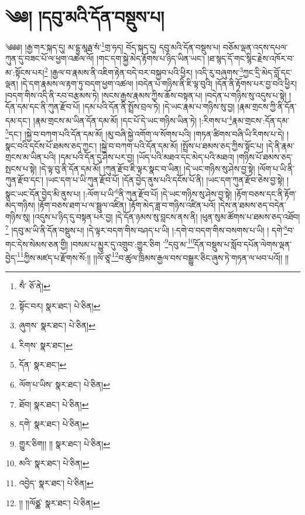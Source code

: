 \setcounter{footnote}{0} 
\chapter{༄༅། །དབུ་མའི་དོན་བསྡུས་པ།}༄༅༅། །རྒྱ་གར་སྐད་དུ། མ་དྷྱ་མཱརྠ་སཾ་\footnote{སྃ་  ཅོ་ནེ། }གྲ་ཧད། བོད་སྐད་དུ། དབུ་མའི་དོན་བསྡུས་པ། བཅོམ་ལྡན་འདས་དཔལ་ཀུན་དུ་བཟང་པོ་ལ་ཕྱག་འཚལ་ལོ། །གང་དག་སྐྱེ་མེད་རྟོགས་པ་ཉིད་ཡིན་ཡང་། །ཐ་སྙད་དོ་གང་སྙིང་རྗེས་འཁོར་བ་མ་:སྟོངས་པར།\footnote{སྟོང་བར།  སྣར་ཐང་།  པེ་ཅིན། } །རྒྱལ་བ་རྣམས་ནི་འཇིག་རྟེན་བདེ་བར་བསྐྱབ་པའི་ཕྱིར། །འདི་རུ་བཞུགས་\footnote{ཞུགས་  སྣར་ཐང་།  པེ་ཅིན། }ཀྱང་དྲི་མེད་བློ་དང་ལྡན། །དེ་དག་རྣམས་ལ་རྟག་ཏུ་བདག་ཕྱག་འཚལ། །བདེན་པ་གཉིས་ནི་ཇི་ལྟ་བུའི། །དོན་ནི་རྟོགས་པར་བྱ་བའི་ཕྱིར། །བདག་གིས་འདི་ནི་རབ་བརྩམས་ཏེ། །སངས་རྒྱས་རྣམས་ཀྱིས་ཆོས་བསྟན་པ། །བདེན་པ་གཉིས་སུ་འདུས་པ་སྟེ། །དོན་དམ་དང་ནི་ཀུན་རྫོབ་པོ། །དམ་པའི་དོན་ནི་སྤྲོས་བྲལ་ཏེ། །དེ་ཡང་རྣམ་པ་གཉིས་སུ་བྱ། །རྣམ་གྲངས་ཀྱི་ནི་དོན་དམ་དང་། །རྣམ་གྲངས་མ་ཡིན་དོན་དམ་མོ། །དང་པོ་དེ་ཡང་གཉིས་ཡིན་ཏེ། །:རིགས་པ་\footnote{རིགས་  སྣར་ཐང་། }རྣམ་གྲངས་:དོན་དམ་\footnote{དོན་  སྣར་ཐང་། }དང་། །སྐྱེ་བ་བཀག་པའི་དོན་དམ་མོ། །མུ་བཞི་སྐྱེ་འགོག་ལ་སོགས་པའི། །གཏན་ཚིགས་བཞི་ཡི་རིགས་པ་དེ། །སྣང་བའི་དངོས་པོ་ཐམས་ཅད་ཀྱང་། །སྐྱེ་བ་བཀག་པའི་དོན་དམ་མོ། །སྤྲོས་པ་ཐམས་ཅད་ཀྱིས་སྟོང་པ། །དེ་ནི་རྣམ་གྲངས་མ་ཡིན་པའི། །དམ་པའི་དོན་དུ་ཤེས་པར་བྱ། །ཡོད་པའི་མཐའ་དང་མེད་པའི་མཐའ། །གཉིས་པོ་ཐམས་ཅད་སྤངས་པ་སྟེ། །དེ་ལྟ་བུ་ནི་དོན་དམ་མོ། །ཀུན་རྫོབ་ཇི་ལྟར་སྣང་བ་ཡིན། །དེ་ཡང་གཉིས་སུ་ཤེས་བྱ་སྟེ། །ལོག་པ་ཡི་ནི་ཀུན་རྫོབ་དང་། །ཡང་དག་པ་ཡི་ཀུན་རྫོབ་པོ། །དོན་བྱེད་ནུས་པའི་དངོས་པོ་ནི། །ཡང་དག་ཀུན་རྫོབ་ཅེས་བྱ་སྟེ། །སྣང་ཡང་དོན་བྱེད་མི་ནུས་པ། །:ལོག་པ་ཡི་\footnote{ལོག་པ་ཡིས་  སྣར་ཐང་།  པེ་ཅིན། }ནི་ཀུན་རྫོབ་པོ། །དེ་ཡང་གཉིས་སུ་ཤེས་བྱ་སྟེ། །རྟོག་བཅས་དང་ནི་རྟོག་མེད་གཉིས། །རྟོག་བཅས་ཐག་པ་ལ་སྦྲུལ་འཛིན། །རྟོག་མེད་ཟླ་བ་གཉིས་འཛིན་པའོ། །དེས་ན་ཐམས་ཅད་བདེན་གཉིས་སུ། །འདུས་པ་ཉིད་དུ་བསྟན་པར་བྱ། །དེ་དོན་ཉམས་སུ་བླངས་ནས་ནི། །ཕུན་སུམ་ཚོགས་པ་ཐམས་ཅད་འཐོབ།\footnote{ཐོབ།  སྣར་ཐང་།  པེ་ཅིན། } །དབུ་མ་ཡི་ནི་དོན་བསྡུས་པ། །དེ་ལྟར་བདག་གིས་བཤད་པ་ཡི། །:དགེ་བ་བདག་གིས་བསགས་པ་ཡི། །
དགེ་\footnote{དགེ་  སྣར་ཐང་།  པེ་ཅིན། }བ་གང་དེས་སེམས་ཅན་གྱི། །བསམ་པ་མྱུར་དུ་འགྲུབ་:གྱུར་ཅིག ་\footnote{གྱུར་ཅིག།། །།  སྣར་ཐང་།  པེ་ཅིན། }དབུ་མ་\footnote{མའི་  སྣར་ཐང་།  པེ་ཅིན། }དོན་བསྡུས་པ་སློབ་དཔོན་ལེགས་ལྡན་བྱེད་\footnote{འབྱེད་  སྣར་ཐང་།  པེ་ཅིན། }ཀྱིས་མཛད་པ་རྫོགས་སོ:།། །།ལོ་ཙཱ་\footnote{།། །།ལོཙྪ་  སྣར་ཐང་།  པེ་ཅིན། }བ་ཚུལ་ཁྲིམས་རྒྱལ་བས་བསྒྱུར་ཅིང་ཞུས་ཏེ་གཏན་ལ་ཕབ་པའོ།། །།